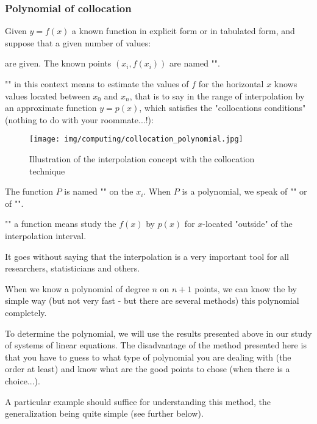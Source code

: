 	\pagebreak
	\subsubsection{Polynomial of collocation}
	Given $y=f(x)$ a known function in explicit form or in tabulated form, and suppose that a given number of values:
	
	are given. The known points $(x_i,f(x_i))$ are named "".
	
	"" in this context means to estimate the values of $f$ for the horizontal $x$ knows values located between $x_0$ and $x_n$, that is to say in the range of interpolation by an approximate function $y=p(x)$, which satisfies the "collocations conditions" (nothing to do with your roommate...!):
	
	\begin{figure}[H]
		\centering
		\texttt{[image: img/computing/collocation\_polynomial.jpg]}
		\caption{Illustration of the interpolation concept with the collocation technique}
	\end{figure}
	The function $P$ is named "" on the $x_i$. When $P$ is a polynomial, we speak of "" or of "".
	
	"" a function means study the $f(x)$ by $p(x)$ for $x$-located "outside" of the interpolation interval.
	\begin{tcolorbox}[title=Remark,colframe=black,arc=10pt]
	It goes without saying that the interpolation is a very important tool for all researchers, statisticians and others.
	\end{tcolorbox}	
	When we know a polynomial of degree $n$ on $n + 1$ points, we can know the by simple way (but not very fast - but there are several methods) this polynomial completely.
	
	To determine the polynomial, we will use the results presented above in our study of systems of linear equations. The disadvantage of the method presented here is that you have to guess to what type of polynomial you are dealing with (the order at least) and know what are the good points to chose (when there is a choice...).
	
	A particular example should suffice for understanding this method, the generalization being quite simple (see further below).
	
